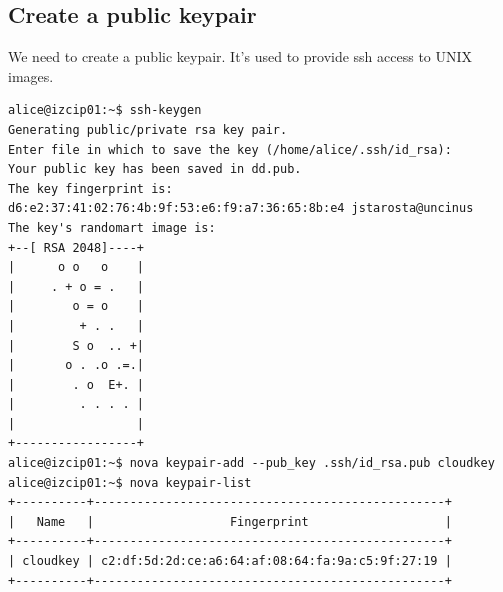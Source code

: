 \documentclass[a4paper,ngerman,bibtotocliststotoc]{scrartcl}
\begin{document}
\subsection{Create a public keypair}
\label{sec:create-publ-keyp}
We need to create a public keypair. It's used to provide ssh access to
UNIX images.
\begin{verbatim}
alice@izcip01:~$ ssh-keygen 
Generating public/private rsa key pair.
Enter file in which to save the key (/home/alice/.ssh/id_rsa):
Your public key has been saved in dd.pub.
The key fingerprint is:
d6:e2:37:41:02:76:4b:9f:53:e6:f9:a7:36:65:8b:e4 jstarosta@uncinus
The key's randomart image is:
+--[ RSA 2048]----+
|      o o   o    |
|     . + o = .   |
|        o = o    |
|         + . .   |
|        S o  .. +|
|       o . .o .=.|
|        . o  E+. |
|         . . . . |
|                 |
+-----------------+
alice@izcip01:~$ nova keypair-add --pub_key .ssh/id_rsa.pub cloudkey
alice@izcip01:~$ nova keypair-list
+----------+-------------------------------------------------+
|   Name   |                   Fingerprint                   |
+----------+-------------------------------------------------+
| cloudkey | c2:df:5d:2d:ce:a6:64:af:08:64:fa:9a:c5:9f:27:19 |
+----------+-------------------------------------------------+
\end{verbatim}
\end{document}
